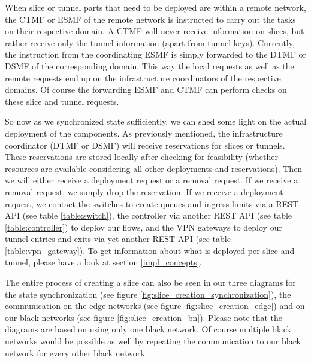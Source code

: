 When slice or tunnel parts that need to be deployed are within a remote network, the CTMF or ESMF of the remote network is instructed to carry out the tasks on their respective domain. A CTMF will never receive information on slices, but rather receive only the tunnel information (apart from tunnel keys). Currently, the instruction from the coordinating ESMF is simply forwarded to the DTMF or DSMF of the corresponding domain. This way the local requests as well as the remote requests end up on the infrastructure coordinators of the respective domains. Of course the forwarding ESMF and CTMF can perform checks on these slice and tunnel requests.

So now as we synchronized state sufficiently, we can shed some light on the actual deployment of the components. As previously mentioned, the infrastructure coordinator (DTMF or DSMF) will receive reservations for slices or tunnels. These reservations are stored locally after checking for feasibility (whether resources are available considering all other deployments and reservations). Then we will either receive a deployment request or a removal request. If we receive a removal request, we simply drop the reservation. If we receive a deployment request, we contact the switches to create queues and ingress limits via a REST API (see table \ref{table:switch}), the controller via another REST API (see table \ref{table:controller}) to deploy our flows, and the VPN gateways to deploy our tunnel entries and exits via yet another REST API (see table \ref{table:vpn_gateway}). To get information about what is deployed per slice and tunnel, please have a look at section \ref{impl_concepts}.

The entire process of creating a slice can also be seen in our three diagrams for the state synchronization (see figure \ref{fig:slice_creation_synchronization}), the communication on the edge networks (see figure \ref{fig:slice_creation_edge}) and on our black networks (see figure \ref{fig:slice_creation_bn}). Please note that the diagrams are based on using only one black network. Of course multiple black networks would be possible as well by repeating the communication to our black network for every other black network.

